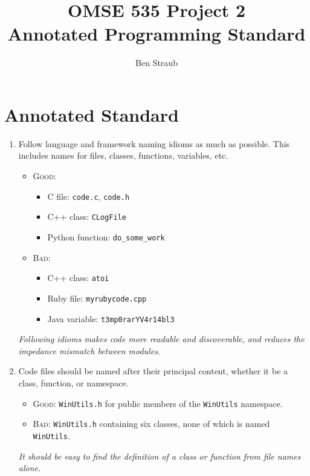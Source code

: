 \documentclass[11pt]{article}
\begin{document}
\title{OMSE 535 Project 2 \\ Annotated Programming Standard}
\author{Ben Straub}
\maketitle



\section{Annotated Standard}

\begin{enumerate}
\item Follow language and framework naming idioms as much as possible.  This includes names for
  files, classes, functions, variables, etc.
  \begin{itemize}
  \item \textsc{Good:}
    \begin{itemize}
    \item C file: \texttt{code.c}, \texttt{code.h}
    \item C++ class: \texttt{CLogFile}
    \item Python function: \texttt{do\_some\_work}
    \end{itemize}
  \item \textsc{Bad:}
    \begin{itemize}
    \item C++ class: \texttt{atoi}
    \item Ruby file: \texttt{myrubycode.cpp}
    \item Java variable: \texttt{t3mp0rarYV4r14bl3}
    \end{itemize}
  \end{itemize}
  {\it Following idioms makes code more readable and discoverable, and reduces the impedance
    mismatch between modules. }

\item Code files should be named after their principal content, whether it be a class, function, or
  namespace.
  \begin{itemize}
  \item \textsc{Good:} \texttt{WinUtils.h} for public members of the \texttt{WinUtils} namespace.
  \item \textsc{Bad:} \texttt{WinUtils.h} containing six classes, none of which is named
    \texttt{WinUtils}.
  \end{itemize}
  {\it It should be easy to find the definition of a class or function from file names alone. }
  

\end{enumerate}
\end{document}
